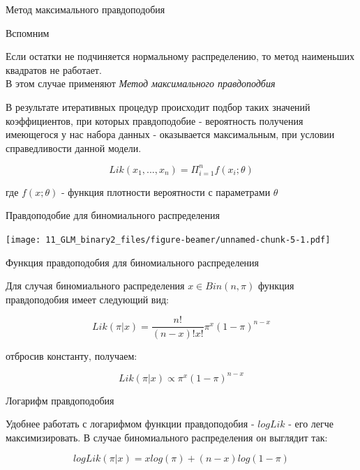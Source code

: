 \documentclass[ignorenonframetext,]{beamer}
\begin{document}
\begin{frame}{Метод максимального правдоподобия}

\begin{block}{Вспомним}

Если остатки не подчиняется нормальному распределению, то метод
наименьших квадратов не работает.\\
В этом случае применяют \emph{Метод максимального правдоподбия}

В результате итеративных процедур происходит подбор таких значений
коэффициентов, при которых правдоподобие - вероятность получения
имеющегося у нас набора данных - оказывается максимальным, при условии
справедливости данной модели.

\[ Lik(x_1, ..., x_n) = \Pi^n _{i = 1}f(x_i; \theta)\]

где \(f(x; \theta)\) - функция плотности вероятности с параметрами
\(\theta\)

\end{block}

\end{frame}

\begin{frame}{Правдоподобие для биномиального распределения}

\texttt{[image: 11\_GLM\_binary2\_files/figure-beamer/unnamed-chunk-5-1.pdf]}

\end{frame}

\begin{frame}{Функция правдоподобия для биномиального распределения}

Для случая биномиального распределения \(x \in Bin(n, \pi)\) функция
правдоподобия имеет следующий вид:

\[Lik(\pi|x) = \frac{n!}{(n-x)!x!}\pi^x(1-\pi)^{n-x}\]

отбросив константу, получаем:

\[Lik(\pi|x) \propto \pi^x(1-\pi)^{n-x}\]

\begin{block}{Логарифм правдоподобия}

Удобнее работать с логарифмом функции правдоподобия - \(logLik\) - его
легче максимизировать. В случае биномиального распределения он выглядит
так:

\[logLik(\pi|x) = x log(\pi) + (n-x)log(1-\pi)\]

\end{block}

\end{frame}
\end{document}
